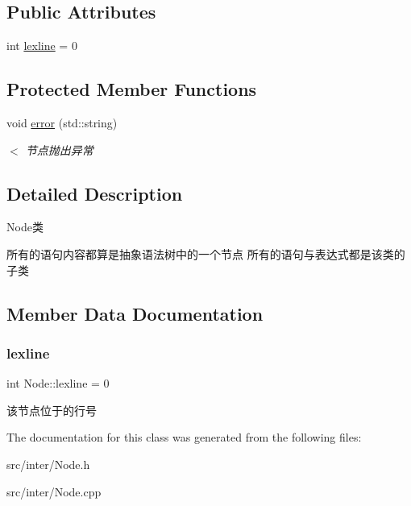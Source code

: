 \subsection*{Public Attributes}
\begin{DoxyCompactItemize}
\item 
int \hyperlink{class_node_a8e50263ff9416be77e26edfbf6b926a1}{lexline} = 0
\end{DoxyCompactItemize}
\subsection*{Protected Member Functions}
\begin{DoxyCompactItemize}
\item 
\mbox{\label{class_node_aa1bb6c155277eb2c073a60c00674b8b6}} 
void \hyperlink{class_node_aa1bb6c155277eb2c073a60c00674b8b6}{error} (std\+::string)
\begin{DoxyCompactList}\small\item\em $<$ 节点抛出异常 \end{DoxyCompactList}\end{DoxyCompactItemize}


\subsection{Detailed Description}
Node类 

所有的语句内容都算是抽象语法树中的一个节点 所有的语句与表达式都是该类的子类 

\subsection{Member Data Documentation}
\mbox{\label{class_node_a8e50263ff9416be77e26edfbf6b926a1}} 
\subsubsection{\texorpdfstring{lexline}{lexline}}
{\footnotesize\ttfamily int Node\+::lexline = 0}

该节点位于的行号 

The documentation for this class was generated from the following files\+:\begin{DoxyCompactItemize}
\item 
src/inter/Node.\+h\item 
src/inter/Node.\+cpp\end{DoxyCompactItemize}
